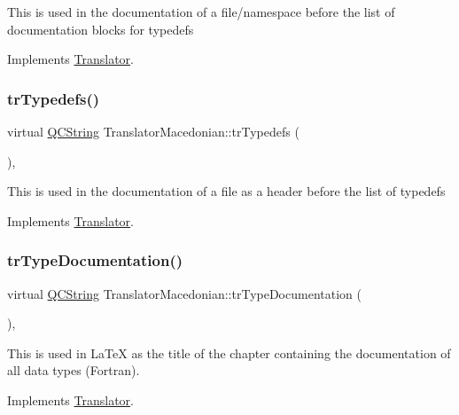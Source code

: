 This is used in the documentation of a file/namespace before the list of documentation blocks for typedefs 

Implements \mbox{\hyperlink{class_translator}{Translator}}.

\mbox{\label{class_translator_macedonian_a11c3d58f1664dc5b4ac4cb4abae8b8bf}} 
\subsubsection{\texorpdfstring{trTypedefs()}{trTypedefs()}}
{\footnotesize\ttfamily virtual \mbox{\hyperlink{class_q_c_string}{Q\+C\+String}} Translator\+Macedonian\+::tr\+Typedefs (\begin{DoxyParamCaption}{ }\end{DoxyParamCaption})\hspace{0.3cm}{\ttfamily [inline]}, {\ttfamily [virtual]}}

This is used in the documentation of a file as a header before the list of typedefs 

Implements \mbox{\hyperlink{class_translator}{Translator}}.

\mbox{\label{class_translator_macedonian_a45df65a66ff10498ef77c8a8eb0e06a7}} 
\subsubsection{\texorpdfstring{trTypeDocumentation()}{trTypeDocumentation()}}
{\footnotesize\ttfamily virtual \mbox{\hyperlink{class_q_c_string}{Q\+C\+String}} Translator\+Macedonian\+::tr\+Type\+Documentation (\begin{DoxyParamCaption}{ }\end{DoxyParamCaption})\hspace{0.3cm}{\ttfamily [inline]}, {\ttfamily [virtual]}}

This is used in La\+TeX as the title of the chapter containing the documentation of all data types (Fortran). 

Implements \mbox{\hyperlink{class_translator}{Translator}}.

